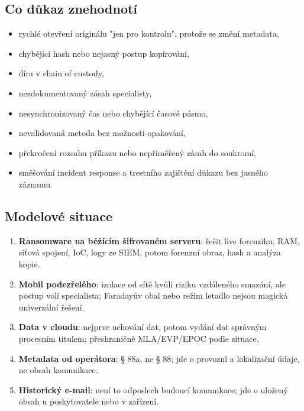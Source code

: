 \subsection*{Co důkaz znehodnotí}
\begin{itemize}
  \item rychlé otevření originálu "jen pro kontrolu", protože se změní metadata,
  \item chybějící hash nebo nejasný postup kopírování,
  \item díra v chain of custody,
  \item nezdokumentovaný zásah specialisty,
  \item nesynchronizovaný čas nebo chybějící časové pásmo,
  \item nevalidovaná metoda bez možnosti opakování,
  \item překročení rozsahu příkazu nebo nepřiměřený zásah do soukromí,
  \item směšování incident response a trestního zajištění důkazu bez jasného záznamu.
\end{itemize}

\subsection*{Modelové situace}
\begin{enumerate}
  \item \textbf{Ransomware na běžícím šifrovaném serveru}: řešit live forenziku, RAM, síťová spojení, IoC, logy ze SIEM, potom forenzní obraz, hash a analýza kopie.
  \item \textbf{Mobil podezřelého}: izolace od sítě kvůli riziku vzdáleného smazání, ale postup volí specialista; Faradayův obal nebo režim letadlo nejsou magická univerzální řešení.
  \item \textbf{Data v cloudu}: nejprve uchování dat, potom vydání dat správným procesním titulem; přeshraničně MLA/EVP/EPOC podle situace.
  \item \textbf{Metadata od operátora}: § 88a, ne § 88; jde o provozní a lokalizační údaje, ne obsah komunikace.
  \item \textbf{Historický e-mail}: není to odposlech budoucí komunikace; jde o uložený obsah u poskytovatele nebo v zařízení.
\end{enumerate}

